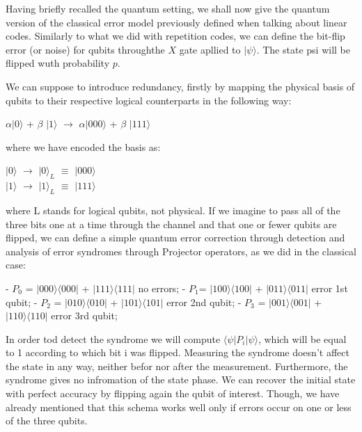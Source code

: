 \documentclass[12pt]{report}
\begin{document}
	\begin{minipage}{1 \textwidth}
		
		Having briefly recalled the quantum setting, we shall now give the quantum version of the classical error model previously defined when talking about linear codes.
		Similarly to what we did with repetition codes, we can define the bit-flip error (or noise) for qubits throughthe $X$ gate apllied to $|\psi \rangle$. The state psi will be flipped wuth probability $p$.\newline
		
		We can suppose to introduce redundancy, firstly by mapping the physical basis of qubits to their respective logical counterparts in the following way:
		
		\begin{center}
			$\alpha |0 \rangle$ + $\beta$ $|1 \rangle$ $\rightarrow$ $\alpha |000 \rangle$ + $\beta$ $|111 \rangle$
		\end{center}
		
		where we have encoded the basis as:
		
		\begin{center}
			$|0 \rangle$ $\rightarrow$ $|0 \rangle_L$ $\equiv$ $|000 \rangle$   \\
		    $|1 \rangle$ $\rightarrow$ $|1 \rangle_L$ $\equiv$ $|111 \rangle$
		\end{center}
		
		where L stands for logical qubits, not physical. \newline
		If we imagine to pass all of the three bits one at a time through the channel and that one or fewer qubits are flipped, we can define a simple quantum error correction through detection and analysis of error syndromes through Projector operators, as we did in the classical case:\newline
		
		- $P_0$ = $|000 \rangle \langle 000|$ + $|111 \rangle \langle 111|$ no errors;\newline
		- $P_1$= $|100 \rangle \langle 100|$ + $|011 \rangle \langle 011|$ error 1st qubit;\newline
		- $P_2$ = $|010 \rangle \langle 010|$ + $|101 \rangle \langle 101|$ error 2nd qubit;\newline
		- $P_3$ = $|001 \rangle \langle 001|$ + $|110 \rangle \langle 110|$ error 3rd qubit;\newline
		
		In order tod detect the syndrome we will compute $\langle \psi| P_i | \psi \rangle $, which will be equal to 1 according to which bit i was flipped.
		Measuring the syndrome doesn't affect the state in any way, neither befor nor after the measurement. Furthermore, the syndrome gives no infromation of the state phase. We can recover the initial state with perfect accuracy by flipping again the qubit of interest.\newline
		Though, we have already mentioned that this schema works well only if errors occur on one or less of the three qubits.\newline
		

\end{minipage}
\end{document}
